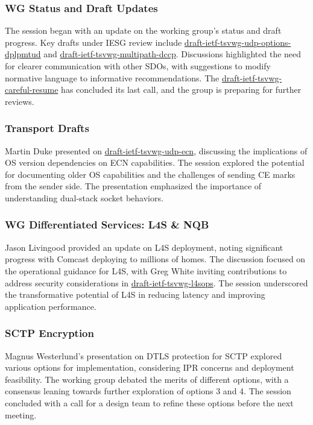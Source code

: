\documentclass{article}
\begin{document}
\subsubsection{WG Status and Draft Updates}
The session began with an update on the working group's status and draft progress. Key drafts under IESG review include \href{https://datatracker.ietf.org/doc/html/draft-ietf-tsvwg-udp-options-dplpmtud}{draft-ietf-tsvwg-udp-options-dplpmtud} and \href{https://datatracker.ietf.org/doc/html/draft-ietf-tsvwg-multipath-dccp}{draft-ietf-tsvwg-multipath-dccp}. Discussions highlighted the need for clearer communication with other SDOs, with suggestions to modify normative language to informative recommendations. The \href{https://datatracker.ietf.org/doc/html/draft-ietf-tsvwg-careful-resume}{draft-ietf-tsvwg-careful-resume} has concluded its last call, and the group is preparing for further reviews.

\subsubsection{Transport Drafts}
Martin Duke presented on \href{https://datatracker.ietf.org/doc/html/draft-ietf-tsvwg-udp-ecn}{draft-ietf-tsvwg-udp-ecn}, discussing the implications of OS version dependencies on ECN capabilities. The session explored the potential for documenting older OS capabilities and the challenges of sending CE marks from the sender side. The presentation emphasized the importance of understanding dual-stack socket behaviors.

\subsubsection{WG Differentiated Services: L4S \& NQB}
Jason Livingood provided an update on L4S deployment, noting significant progress with Comcast deploying to millions of homes. The discussion focused on the operational guidance for L4S, with Greg White inviting contributions to address security considerations in \href{https://datatracker.ietf.org/doc/html/draft-ietf-tsvwg-l4sops}{draft-ietf-tsvwg-l4sops}. The session underscored the transformative potential of L4S in reducing latency and improving application performance.

\subsubsection{SCTP Encryption}
Magnus Westerlund's presentation on DTLS protection for SCTP explored various options for implementation, considering IPR concerns and deployment feasibility. The working group debated the merits of different options, with a consensus leaning towards further exploration of options 3 and 4. The session concluded with a call for a design team to refine these options before the next meeting.
\end{document}
